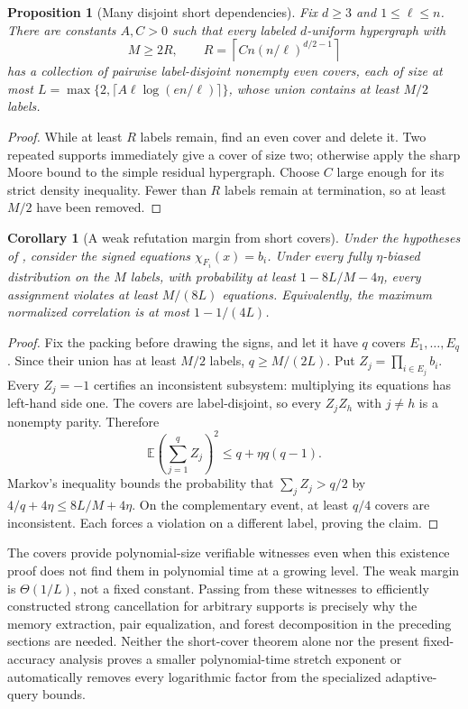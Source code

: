 \documentclass[letterpaper,11pt]{article}
\newtheorem{corollary}[theorem]{Corollary}
\newtheorem{proposition}[theorem]{Proposition}
\theoremstyle{definition}
\newcommand{\E}{\mathbb E}
\begin{document}
\begin{proposition}[Many disjoint short dependencies]
\label{prop:moore-packing}
Fix $d\ge3$ and $1\le\ell\le n$. There are constants $A,C>0$
such that every labeled $d$-uniform hypergraph with
\[
 M\ge2R,\qquad
 R=\left\lceil Cn(n/\ell)^{d/2-1}\right\rceil
\]
has a collection of pairwise label-disjoint nonempty even covers,
each of size at most
$L=\max\{2,\lceil A\ell\log(en/\ell)\rceil\}$,
whose union contains at least $M/2$ labels.
\end{proposition}
\begin{proof}
While at least $R$ labels remain, find an even cover and delete it.
Two repeated supports immediately give a cover of size two;
otherwise apply the sharp Moore bound to the simple residual
hypergraph. Choose $C$ large enough for its strict density
inequality. Fewer than $R$ labels remain at termination, so at
least $M/2$ have been removed.
\end{proof}

\begin{corollary}[A weak refutation margin from short covers]
\label{cor:moore-weak}
Under the hypotheses of , consider the
signed equations $\chi_{F_i}(x)=b_i$. Under every fully
$\eta$-biased distribution on the $M$ labels, with probability
at least $1-8L/M-4\eta$, every assignment violates at least
$M/(8L)$ equations. Equivalently, the maximum normalized
correlation is at most $1-1/(4L)$.
\end{corollary}
\begin{proof}
Fix the packing before drawing the signs, and let it have $q$ covers
$E_1,\ldots,E_q$. Since their union has at least $M/2$ labels,
$q\ge M/(2L)$. Put $Z_j=\prod_{i\in E_j}b_i$. Every $Z_j=-1$
certifies an inconsistent subsystem: multiplying its equations
has left-hand side one. The covers are label-disjoint, so every
$Z_jZ_h$ with $j\ne h$ is a nonempty parity. Therefore
\[
 \E\left(\sum_{j=1}^q Z_j\right)^2
 \le q+\eta q(q-1).
\]
Markov's inequality bounds the probability that
$\sum_jZ_j>q/2$ by $4/q+4\eta\le8L/M+4\eta$.
On the complementary event, at least $q/4$ covers are inconsistent.
Each forces a violation on a different label, proving the claim.
\end{proof}

The covers provide polynomial-size verifiable witnesses even when
this existence proof does not find them in polynomial time at a
growing level. The weak margin is $\Theta(1/L)$, not a fixed
constant. Passing from these witnesses to efficiently constructed
strong cancellation for arbitrary supports is precisely why the
memory extraction, pair equalization, and forest decomposition in
the preceding sections are needed. Neither the short-cover theorem
alone nor the present fixed-accuracy analysis proves a smaller
polynomial-time stretch exponent or automatically removes every
logarithmic factor from the specialized adaptive-query bounds.
\end{document}
